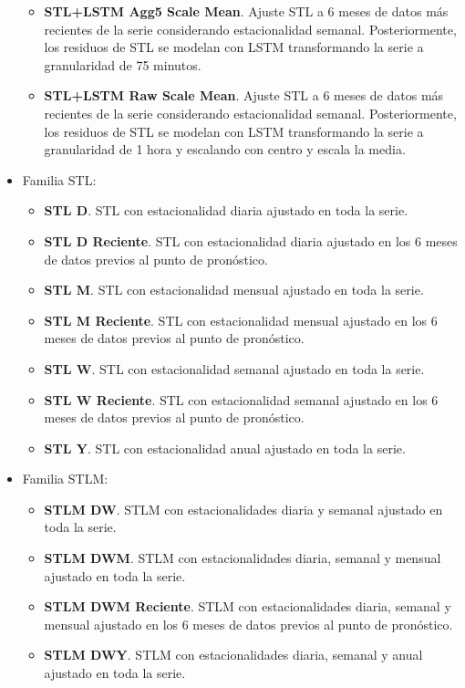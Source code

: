 \documentclass[]{book}
\providecommand{\tightlist}{%
  \setlength{\itemsep}{0pt}\setlength{\parskip}{0pt}}
\begin{document}
\begin{itemize}
  \begin{itemize}
  \tightlist
  \item
    \textbf{STL+LSTM Agg5 Scale Mean}. Ajuste STL a 6 meses de datos más
    recientes de la serie considerando estacionalidad semanal.
    Posteriormente, los residuos de STL se modelan con LSTM
    transformando la serie a granularidad de 75 minutos.
  \item
    \textbf{STL+LSTM Raw Scale Mean}. Ajuste STL a 6 meses de datos más
    recientes de la serie considerando estacionalidad semanal.
    Posteriormente, los residuos de STL se modelan con LSTM
    transformando la serie a granularidad de 1 hora y escalando con
    centro y escala la media.
  \end{itemize}
\item
  Familia STL:

  \begin{itemize}
  \tightlist
  \item
    \textbf{STL D}. STL con estacionalidad diaria ajustado en toda la
    serie.
  \item
    \textbf{STL D Reciente}. STL con estacionalidad diaria ajustado en
    los 6 meses de datos previos al punto de pronóstico.
  \item
    \textbf{STL M}. STL con estacionalidad mensual ajustado en toda la
    serie.
  \item
    \textbf{STL M Reciente}. STL con estacionalidad mensual ajustado en
    los 6 meses de datos previos al punto de pronóstico.
  \item
    \textbf{STL W}. STL con estacionalidad semanal ajustado en toda la
    serie.
  \item
    \textbf{STL W Reciente}. STL con estacionalidad semanal ajustado en
    los 6 meses de datos previos al punto de pronóstico.
  \item
    \textbf{STL Y}. STL con estacionalidad anual ajustado en toda la
    serie.
  \end{itemize}
\item
  Familia STLM:

  \begin{itemize}
  \tightlist
  \item
    \textbf{STLM DW}. STLM con estacionalidades diaria y semanal
    ajustado en toda la serie.
  \item
    \textbf{STLM DWM}. STLM con estacionalidades diaria, semanal y
    mensual ajustado en toda la serie.
  \item
    \textbf{STLM DWM Reciente}. STLM con estacionalidades diaria,
    semanal y mensual ajustado en los 6 meses de datos previos al punto
    de pronóstico.
  \item
    \textbf{STLM DWY}. STLM con estacionalidades diaria, semanal y anual
    ajustado en toda la serie.
  \end{itemize}
\end{itemize}
\end{document}
